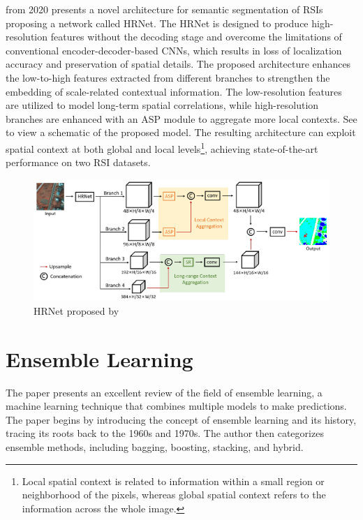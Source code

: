  \cite{rs12040701} from 2020 presents a novel architecture for semantic segmentation of \acp{RSI} proposing a network called \ac{HRNet}. The \ac{HRNet} is designed to produce high-resolution features without the decoding stage and overcome the limitations of conventional encoder-decoder-based \acp{CNN}, which results in loss of localization accuracy and preservation of spatial details. The proposed architecture enhances the low-to-high features extracted from different branches to strengthen the embedding of scale-related contextual information. The low-resolution features are utilized to model long-term spatial correlations, while high-resolution branches are enhanced with an \ac{ASP} module to aggregate more local contexts. See  to view a schematic of the proposed model. The resulting architecture can exploit spatial context at both global and local levels\footnote{Local spatial context is related to information within a small region or neighborhood of the pixels, whereas global spatial context refers to the information across the whole image.}, achieving state-of-the-art performance on two \ac{RSI} datasets.

\begin{figure}[H]%
    \centering
    \includegraphics[width=\imgWidthXL]{images/multi_scale_context_aggregation.png}
    \caption[\acf{HRNet}]{\ac{HRNet} proposed by \cite{rs12040701}}
    \label{multi_scale_context_aggregation}
\end{figure}
\newpage

\section{Ensemble Learning}
The paper  \cite{Dong2020} presents an excellent review of the field of ensemble learning, a machine learning technique that combines multiple models to make predictions. The paper begins by introducing the concept of ensemble learning and its history, tracing its roots back to the 1960s and 1970s. The author then categorizes ensemble methods, including bagging, boosting, stacking, and hybrid.

